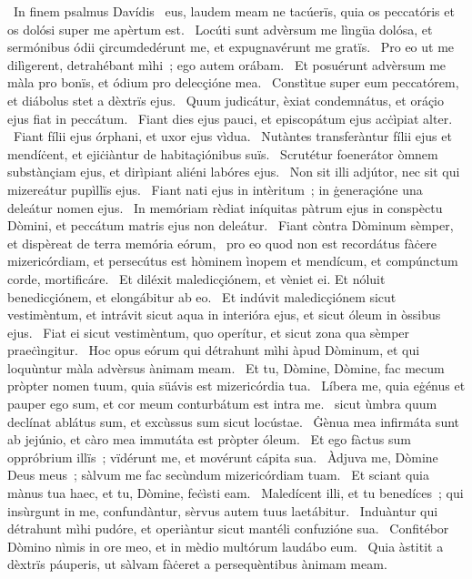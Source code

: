 {~In finem psalmus Davídis}
{%
~eus, laudem meam ne tacúerïs, quia os peccatóris et os dolósi super me apèrtum est.
~Locúti sunt advèrsum me lìngüa dolósa, et sermónibus ódii çircumdedérunt me, et expugnavérunt me gratïs.
~Pro eo ut me dilìgerent, detrahébant mìhi~; ego autem orábam.
~Et posuérunt advèrsum me màla pro bonïs, et ódium pro delecçióne mea.
~Constìtue super eum peccatórem, et diábolus stet a dèxtrïs ejus.
~Quum judicátur, èxiat condemnátus, et oráçio ejus fiat in peccátum.
~Fiant dies ejus pauci, et episcopátum ejus acċìpiat alter.
~Fiant fílii ejus órphani, et uxor ejus vìdua.
~Nutàntes transferàntur fílii ejus et mendíċent, et ejiċiàntur de habitaçiónibus suïs.
~Scrutétur foenerátor òmnem substànçiam ejus, et dirìpiant aliéni labóres ejus.
~Non sit illi adjútor, nec sit qui mizereátur pupìllïs ejus.
~Fiant nati ejus in intèritum~; in ġeneraçióne una deleátur nomen ejus.
~In memóriam rèdiat iníquitas pàtrum ejus in conspèctu Dòmini, et peccátum matris ejus non deleátur.
~Fiant còntra Dòminum sèmper, et dispèreat de terra memória eórum,
~pro eo quod non est recordátus fàċere mizericórdiam, et persecútus est hòminem ìnopem et mendícum, et compúnctum corde, mortificáre.
~Et diléxit maledicçiónem, et vèniet ei. Et nóluit benedicçiónem, et elongábitur ab eo.
~Et indúvit maledicçiónem sicut vestimèntum, et intrávit sicut aqua in interióra ejus, et sicut óleum in òssibus ejus.
~Fiat ei sicut vestimèntum, quo operítur, et sicut zona qua sèmper praeċìngitur.
~Hoc opus eórum qui détrahunt mìhi àpud Dòminum, et qui loquùntur màla advèrsus ànimam meam.
~Et tu, Dòmine, Dòmine, fac mecum pròpter nomen tuum, quia süávis est mizericórdia tua.
~Líbera me, quia eġénus et pauper ego sum, et cor meum conturbátum est intra me.
~sicut ùmbra quum declínat ablátus sum, et excùssus sum sicut locústae.
~Ġènua mea infirmáta sunt ab jejúnio, et càro mea immutáta est pròpter óleum.
~Et ego fàctus sum oppróbrium illïs~; vïdérunt me, et movérunt cápita sua.
~Àdjuva me, Dòmine Deus meus~; sàlvum me fac secùndum mizericórdiam tuam.
~Et sciant quia mànus tua haec, et tu, Dòmine, feċìsti eam.
~Maledícent illi, et tu benedíces~; qui insùrgunt in me, confundàntur, sèrvus autem tuus laetábitur.
~Induàntur qui détrahunt mìhi pudóre, et operiàntur sicut mantéli confuzióne sua.
~Confitébor Dòmino nìmis in ore meo, et in mèdio multórum laudábo eum.
~Quia àstitit a dèxtrïs páuperis, ut sàlvam fàċeret a persequèntibus ànimam meam.}
